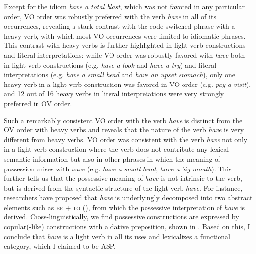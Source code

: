 Except for the idiom \textit{have a total blast}, which was not favored in any particular order, \ac{VO} order was robustly preferred with the verb \textit{have} in all of its occurrences, revealing a stark contrast with the code-switched phrase with a heavy verb, with which most \ac{VO} occurrences were limited to idiomatic phrases. This contrast with heavy verbs is further highlighted in light verb constructions and literal interpretations: while \ac{VO} order was robustly favored with \textit{have} both in light verb constructions (e.g. \textit{have} \textit{a} \textit{look} and \textit{have} \textit{a} \textit{try}) and literal interpretations (e.g. \textit{have} \textit{a} \textit{small} \textit{head} and \textit{have} \textit{an} \textit{upset} \textit{stomach}), only one heavy verb in a light verb construction was favored in \ac{VO} order (e.g. \textit{pay} \textit{a} \textit{visit}), and 12 out of 16 heavy verbs in literal interpretations were very strongly preferred in \ac{OV} order. 


\largerpage
Such a remarkably consistent \ac{VO} order with the verb \textit{have} is distinct from the \ac{OV} order with heavy verbs and reveals that the nature of the verb \textit{have} is very different from heavy verbs. \ac{VO} order was consistent with the verb \textit{have} not only in a light verb construction where the verb does not contribute any lexical-semantic information but also in other phrases in which the meaning of possession arises with \textit{have} (e.g. \textit{have} \textit{a} \textit{small} \textit{head}, \textit{have} \textit{a} \textit{big} \textit{mouth}). This further tells us that the possessive meaning of \textit{have} is not intrinsic to the verb, but is derived from the syntactic structure of the light verb \textit{have}. For instance, researchers have proposed that \textit{have} is underlyingly decomposed into two abstract elements such as \textsc{be} \textsc{+} \textsc{to} (\citealt{Benveniste1966,DenDikken1995,Kim2012}), from which the possessive interpretation of \textit{have} is derived. Cross-linguistically, we find possessive constructions are expressed by copular(-like) constructions with a dative preposition, shown in . Based on this, I conclude that \textit{have} is a light verb in all its uses and lexicalizes a functional category, which I claimed to be \ac{ASP}.


